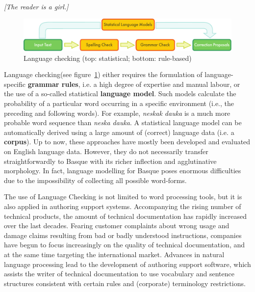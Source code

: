 \begin{multicols}{2}
\hspace{10pt}\textit{[The reader is a girl.] }

\begin{figure}[htb]
  \center
  \includegraphics[width=\textwidth]{../_media/english/language_checking}
  \caption{Language checking (top: statistical; bottom: rule-based)}
  \label{fig:langcheckingaarch_en}
\end{figure}

Language checking(see figure~\ref{fig:langcheckingaarch_en}) either requires the formulation of language-specific \textbf{grammar rules}, i.e. a high degree of expertise and manual labour, or the use of a so-called statistical \textbf{language model}.  Such models calculate the probability of a particular word occurring in a specific environment (i.e., the preceding and following words). For example, \textit{neskak dauka} is a much more probable word sequence than \textit{neska dauka}. A statistical language model can be automatically derived using a large amount of (correct) language data (i.e. a \textbf{corpus}). Up to now, these approaches have mostly been developed and evaluated on English language data. However, they do not necessarily transfer straightforwardly to Basque with its richer inflection and agglutinative morphology. In fact, language modelling for Basque poses enormous difficulties due to the impossibility of collecting all possible word-forms.  

The use of Language Checking is not limited to word processing tools, but it is also applied in authoring support systems. Accompanying the rising number of technical products, the amount of technical documentation has rapidly increased over the last decades. Fearing customer complaints about wrong usage and damage claims resulting from bad or badly understood instructions, companies have begun to focus increasingly on the quality of technical documentation, and at the same time targeting the international market. Advances in natural language processing lead to the development of authoring support software, which assists the writer of technical documentation to use vocabulary and sentence structures consistent with certain rules and (corporate) terminology restrictions. 


\end{multicols}
